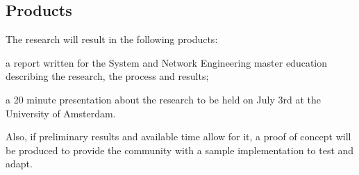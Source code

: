 \documentclass[oneside,twocolumn,7pt,a4paper]{article}
\begin{document}
		\subsection*{Products} %
		\label{sub:products}
			The research will result in the following products: 
			\begin{inparaenum}
				\item a report written for the System and Network Engineering master education describing the research, the process and results;
				\item a 20 minute presentation about the research to be held on July 3rd at the University of Amsterdam.
			\end{inparaenum}
			Also, if preliminary results and available time allow for it, a proof of concept will be produced to provide the community with a sample implementation to test and adapt.
	
	
	
	
\end{document}
